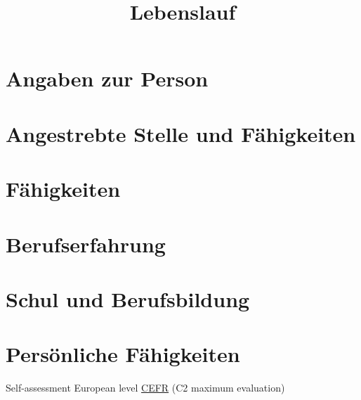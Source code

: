 \documentclass[11pt,a4paper,sans]{moderncv}
\title{Lebenslauf}               %
\begin{document}
\maketitle

\section{Angaben zur Person}


\section{Angestrebte Stelle und Fähigkeiten}
\cvline{}{\Large \myDesideredEmployment}
\cvline{}{\small \mySkillsForJobPosition{\myProfileId} 
}

\section{Fähigkeiten} 
\mySkills{\myProfileId}
 
\section{Berufserfahrung}
\myExperience{\myProfileId}

\section{Schul und Berufsbildung} 
\myEducation{\myProfileId}


\section{Persönliche Fähigkeiten}

\hspace{25mm}\small Self-assessment European level \href{http://europass.cedefop.europa.eu/en/resources/european-language-levels-cefr}{CEFR} (C2 maximum evaluation)\normalsize
\vspace{5mm}
\end{document}
